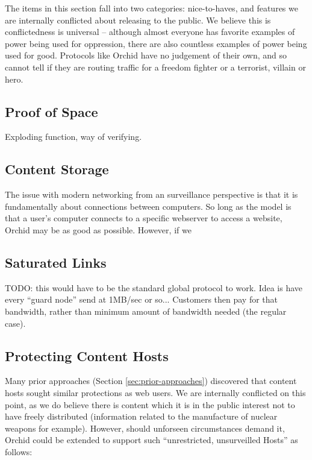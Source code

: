 \documentclass{article}
\newcommand{\mesh}{Orchid}
\newcommand{\Mesh}{\mesh}
\begin{document}
The items in this section fall into two categories: nice-to-haves, and features we are internally conflicted about releasing to the public. We believe this is conflictedness is universal -- although almost everyone has favorite examples of power being used for oppression, there are also countless examples of power being used for good. Protocols like \Mesh{} have no judgement of their own, and so cannot tell if they are routing traffic for a freedom fighter or a terrorist, villain or hero.

\subsection{Proof of Space}
\label{future:proof-of-space}

Exploding function, way of verifying.

\subsection{Content Storage}
\label{subsec:ccn}

The issue with modern networking from an surveillance perspective is that it is fundamentally about connections between computers. So long as the model is that a user's computer connects to a specific webserver to access a website, \Mesh{} may be as good as possible. However, if we

\subsection{Saturated Links}
\label{subsec:saturated-links}

TODO: this would have to be the standard global protocol to work. Idea is have every ``guard node'' send at 1MB/sec or so... Customers then pay for that bandwidth, rather than minimum amount of bandwidth needed (the regular case).

\subsection{Protecting Content Hosts}
\label{subsec:protocol-extentions}

Many prior approaches (Section \ref{sec:prior-approaches}) discovered that content hosts sought similar protections as web users. We are internally conflicted on this point, as we do believe there is content which it is in the public interest not to have freely distributed (information related to the manufacture of nuclear weapons for example). However, should unforseen circumstances demand it, \Mesh{} could be extended to support such ``unrestricted, unsurveilled Hosts'' as follows:
\end{document}
